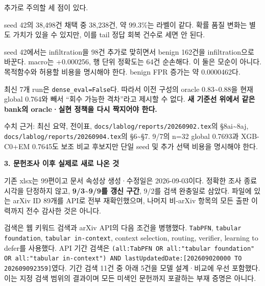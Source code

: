 추가로 주의할 세 점이 있다.

\par\noindent \textbullet\enspace seed 42의 38,498건 채택 중 38,238건, 약 99.3\%는 라벨이 같다. 확률 품질 변화는 별도 가치가 있을 수 있지만, 이를 tail 정답 회복 건수로 세면 안 된다.


\par\noindent \textbullet\enspace seed 42에서는 infiltration을 98건 추가로 맞히면서 benign 162건을 infiltration으로 바꾼다. macro는 +\allowbreak{}0.000256, 행 단위 정확도는 64건 순손해다. 이 둘은 모순이 아니다. 목적함수와 허용할 비용을 명시해야 한다. benign FPR 증가는 약 0.0000462다.


\par\noindent \textbullet\enspace 최신 7개 run은 \texttt{dense\_\allowbreak{}\allowbreak{}ev\allowbreak{}al=\allowbreak{}\allowbreak{}False\allowbreak{}}다. 따라서 이전 구성의 oracle 0.83\textasciitilde{}0.88을 현재 global 0.764와 빼서 “회수 가능한 격차”라고 제시할 수 없다. \textbf{새 기준선 위에서 같은 bank의 oracle·실현 정책을 다시 짝지어야 한다.}


수치 근거: 최신 요약, 전이표, \texttt{docs/\allowbreak{}\allowbreak{}lab\allowbreak{}log/\allowbreak{}\allowbreak{}repo\allowbreak{}rts/\allowbreak{}\allowbreak{}2026\allowbreak{}0902.\allowbreak{}tex\allowbreak{}}의 §8ai\textasciitilde{}8aj, \texttt{docs/\allowbreak{}\allowbreak{}lab\allowbreak{}log/\allowbreak{}\allowbreak{}repo\allowbreak{}rts/\allowbreak{}\allowbreak{}2026\allowbreak{}0904.\allowbreak{}tex\allowbreak{}}의 §6\textasciitilde{}§7. 9/\allowbreak{}7의 n=\allowbreak{}32 global 0.7693과 XGB-C0+\allowbreak{}EM 0.7645도 보조 비교 후보지만 단일 seed 및 추가 선택 비용을 명시해야 한다.

\textbf{3. 문헌조사 이후 실제로 새로 나온 것}

기존 xlsx는 99편이고 문서 속성상 생성·수정일은 2026-09-03이다. 정확한 조사 종료 시각을 단정하지 않고, \textbf{9/\allowbreak{}3\textasciitilde{}9/\allowbreak{}9를 갱신 구간}, 9/\allowbreak{}2를 검색 완충일로 삼았다. 파일에 있는 arXiv ID 89개를 API로 전부 재확인했으며, 나머지 비-arXiv 항목의 모든 출판 이력까지 전수 감사한 것은 아니다.

검색은 웹 키워드 검색과 arXiv API의 다음 조건을 병행했다. \texttt{TabPFN}, \texttt{tabular \allowbreak{}foundati\allowbreak{}on}, \texttt{tabular \allowbreak{}in-\allowbreak{}conte\allowbreak{}xt}, context selection, routing, verifier, learning to defer를 사용했다. API 기간 검색은 \texttt{(all:Tab\allowbreak{}PFN OR a\allowbreak{}ll:"tabu\allowbreak{}lar foun\allowbreak{}dation" \allowbreak{}OR all:"\allowbreak{}tabular \allowbreak{}in-\allowbreak{}conte\allowbreak{}xt") AND\allowbreak{} lastUpd\allowbreak{}atedDate\allowbreak{}:[202609\allowbreak{}020000 T\allowbreak{}O 202609\allowbreak{}092359]}였다. 기간 검색 11건 중 아래 5건을 모델 설계·비교에 우선 포함했다. 이는 지정 검색 범위의 결과이며 모든 미색인 문헌까지 포괄하는 부재 증명은 아니다.

